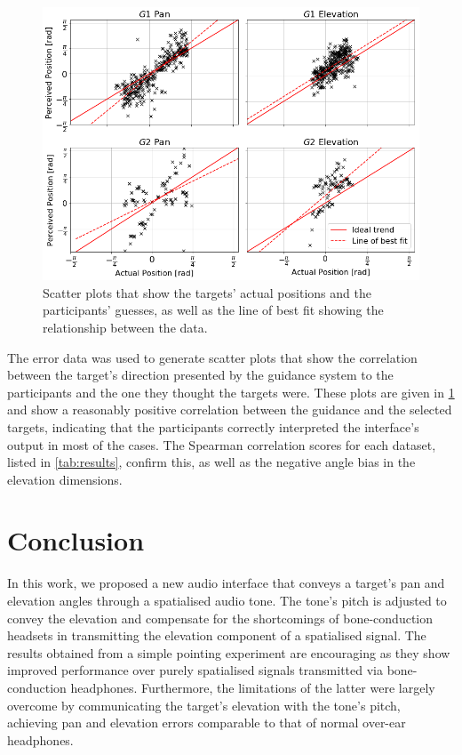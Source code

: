 \documentclass{llncs}
\begin{document}
\begin{figure}
  \centering
  \includegraphics[width=1.0\columnwidth]{figures/correlation.png}
  \caption{Scatter plots that show the targets' actual positions and the participants' guesses, as well as the line of best fit showing the relationship between the data. }\label{fig:correlation-results}
\end{figure}

The error data was used to generate scatter plots that show the correlation between the target's direction presented by the guidance system to the participants and the one they thought the targets were.
These plots are given in \cref{fig:correlation-results} and show a reasonably positive correlation between the guidance and the selected targets, indicating that the participants correctly interpreted the interface's output in most of the cases. 
The Spearman correlation scores for each dataset, listed in \cref{tab:results}, confirm this, as well as the negative angle bias in the elevation dimensions.

\section{Conclusion}\label{sec:conclusion}

In this work, we proposed a new audio interface that conveys a target's pan and elevation angles through a spatialised audio tone.
The tone's pitch is adjusted to convey the elevation and compensate for the shortcomings of bone-conduction headsets in transmitting the elevation component of a spatialised signal.
The results obtained from a simple pointing experiment are encouraging as they show improved performance over purely spatialised signals transmitted via bone-conduction headphones.
Furthermore, the limitations of the latter were largely overcome by communicating the target's elevation with the tone's pitch, achieving pan and elevation errors comparable to that of normal over-ear headphones.
\end{document}
